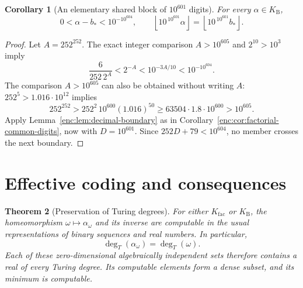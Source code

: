 \documentclass[11pt,a4paper]{article}
\newtheorem{theorem}{Theorem}[section]
\newtheorem{corollary}[theorem]{Corollary}
\theoremstyle{definition}
\theoremstyle{remark}
\numberwithin{equation}{section}
\begin{document}
\begin{corollary}[An elementary shared block of $10^{601}$ digits]
\label{enc:cor:bertrand-common-digits}
For every $\alpha\in K_{\mathrm B}$,
\[
 0<\alpha-b_*<10^{-10^{604}},
 \qquad
 \left\lfloor10^{\,10^{601}}\alpha\right\rfloor
 =\left\lfloor10^{\,10^{601}}b_*\right\rfloor.
\]
\end{corollary}

\begin{proof}
Let $A=252^{252}$.  The exact integer comparison $A>10^{605}$ and
$2^{10}>10^3$ imply
\[
 \frac6{252\,2^A}<2^{-A}<10^{-3A/10}<10^{-10^{604}}.
\]
The comparison $A>10^{605}$ can also be obtained without writing $A$:
$252^5>1.016\cdot10^{12}$ implies
\[
 252^{252}>252^2\,10^{600}(1.016)^{50}
 \ge63504\cdot1.8\cdot10^{600}>10^{605}.
\]
Apply Lemma~\ref{enc:lem:decimal-boundary} as in
Corollary~\ref{enc:cor:factorial-common-digits}, now with $D=10^{601}$.
Since $252D+79<10^{604}$, no member crosses the next boundary.
\end{proof}

\section{Effective coding and consequences}
\label{enc:sec:effective-coding}

\begin{theorem}[Preservation of Turing degrees]
\label{enc:thm:turing-degrees}
For either $K_{\mathrm{fac}}$ or $K_{\mathrm B}$, the homeomorphism
$\omega\mapsto\alpha_\omega$ and its inverse are computable in the usual
representations of binary sequences and real numbers.  In particular,
\[
 \deg_T(\alpha_\omega)=\deg_T(\omega).
\]
Each of these zero-dimensional algebraically independent sets therefore
contains a real of every Turing degree.  Its computable elements form a
dense subset, and its minimum is computable.
\end{theorem}
\end{document}
